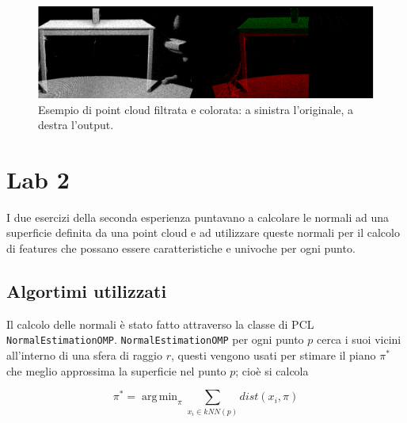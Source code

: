 \documentclass[a4paper]{article}
\DeclareMathOperator*{\argmin}{arg\,min}
\begin{document}
	\begin{figure}
		\centering
		\includegraphics[width=1\textwidth]{images/lab1.png}
		\caption{\label{fig:lab1}Esempio di point cloud filtrata e colorata: a sinistra l'originale, a destra l'output.}
	\end{figure}


\section{Lab 2} \label{sec:lab2}
I due esercizi della seconda esperienza puntavano a calcolare le normali ad una superficie definita da una point cloud e ad utilizzare queste normali per il calcolo di features che possano essere caratteristiche e univoche per ogni punto.

	\subsection{Algortimi utilizzati} \label{sec:lab2_alg}
	Il calcolo delle normali è stato fatto attraverso la classe di PCL \verb|NormalEstimationOMP|. \verb|NormalEstimationOMP| per ogni punto $p$ cerca i suoi vicini all'interno di una sfera di raggio $r$, questi vengono usati per stimare il piano $\pi^*$ che meglio approssima la superficie nel punto $p$; cioè si calcola 
	
	\begin{equation}
	\pi^* = \argmin_{\pi}{\sum_{x_i \in kNN(p)}{dist(x_i,\pi)}}
	\end{equation}
	
\end{document}
